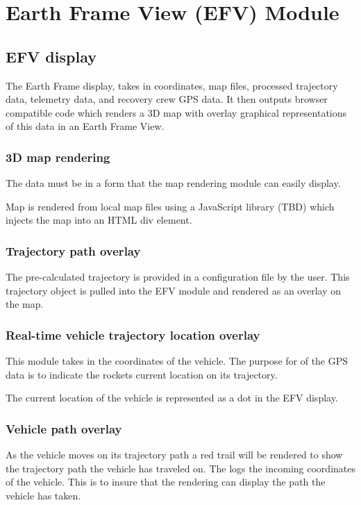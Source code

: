 \section{Earth Frame View (EFV) Module}

\subsection{EFV display}
  The Earth Frame display, takes in coordinates, map files, processed trajectory
  data, telemetry data, and recovery crew GPS data. It then outputs browser
  compatible code which renders a 3D map with overlay graphical
  representations of this data in an Earth Frame View.

\subsubsection{3D map rendering}
  The data must be in a form that the map rendering module can easily display.

  Map is rendered from local map files using a JavaScript library (TBD) which
  injects the map into an HTML div element.

\subsubsection{Trajectory path overlay}
  The pre-calculated trajectory is provided in a configuration file by the user.
  This trajectory object is pulled into the EFV module and rendered as an overlay
  on the map.

\subsubsection{Real-time vehicle trajectory location overlay}
  This module takes in the coordinates of the vehicle. The purpose for of the
  GPS data is to indicate the rockets current location on its trajectory.

  The current location of the vehicle is represented as a dot in the EFV display.

\subsubsection{Vehicle path overlay}
  As the vehicle moves on its trajectory path a red trail will be rendered to show
  the trajectory path the vehicle has traveled on.
  The logs the incoming coordinates of the vehicle. This is to insure
  that the rendering can display the path the vehicle has taken.

